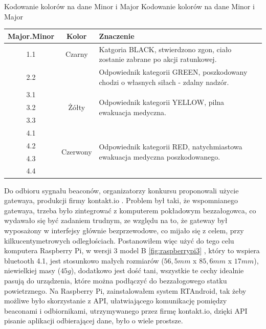 \begin{tablica}
    {Kodowanie kolorów na dane Minor i Major}
    {Kodowanie kolorów na dane Minor i Major}
    {
    \begin{tabular}{|c|c|p{10cm}|} \hline
	    \textbf{Major.Minor} & \textbf{Kolor} & \textbf{Znaczenie} \\ \hline
	    \multirow{2}{*}{1.1} & \multirow{2}{1.65cm}{Czarny} & Katgoria BLACK, stwierdzono zgon, ciało zostanie zabrane po akcji ratunkowej. \\ \hline
	    2.1 & \multirow{2}{1.65cm}{Zielony} & \multirow{2}{10cm}{Odpowiednik kategorii GREEN, poszkodowany chodzi o własnych siłach - zdalny nadzór.} \\
	2.2 & &  \\ \hline
	    3.1 & \multirow{3}{1.65cm}{Żółty} & \multirow{3}{10cm}{Odpowiednik kategorii YELLOW, pilna ewakuacja medyczna.} \\
	3.2 & &  \\
	3.3 & &  \\ \hline
	    4.1 & \multirow{4}{1.65cm}{Czerwony} & \multirow{4}{10cm}{Odpowiednik kategorii RED, natychmiastowa ewakuacja medyczna poszkodowanego.} \\
	4.2 & &  \\
	4.3 & &  \\
	4.4 & &  \\ \hline
    \end{tabular}
    }
    \label{tab:minormajor}
\end{tablica}

Do odbioru sygnału beaconów, organizatorzy konkursu proponowali użycie gatewaya, produkcji firmy kontakt.io \cite{gateway}. Problem był taki, że wspomnianego gatewaya, trzeba było zintegrować z komputerem pokładowym bezzałogowca, co wydawało się być zadaniem trudnym, ze względu na to, że gateway był wyposażony w interfejsy głównie bezprzewodowe, co mijało się z celem, przy kilkucentymetrowych odległościach. Postanowiłem więc użyć do tego celu komputera Raspberry Pi, w wersji 3 model B \ref{fig:raspberrypi3} \cite{raspberrypimodelscomparison}, który to wspiera bluetooth 4.1, jest stosunkowo małych rozmiarów ($56,5 mm$ x $85,6 mm$ x $17 mm$), niewielkiej masy ($45g$), dodatkowo jest dość tani, wszystkie te cechy idealnie pasują do urządzenia, które można podłączyć do bezzałogowego statku powietrznego. Na Raspberry Pi, zainstalowałem system RTAndroid\cite{rtandroid}, tak żeby możliwe było skorzystanie z API, ułatwiającego komunikację pomiędzy beaconami i odbiornikami, utrzymywanego przez firmę kontakt.io, dzięki API pisanie aplikacji odbierającej dane, było o wiele prostsze.

